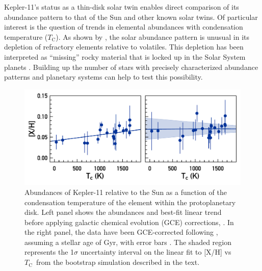 \documentclass[twocolumn,trackchanges]{aastex61}
\newcommand{\tc}{$T_\mathrm{C}$}
\begin{document}
Kepler-11's status as a thin-disk solar twin enables direct comparison of its abundance pattern to that of the Sun and other known solar twins. Of particular interest is the question of trends in elemental abundances with condensation temperature (\tc). As shown by \citet{Melendez2009}, the solar abundance pattern is unusual in its depletion of refractory elements relative to volatiles. This depletion has been interpreted as ``missing'' rocky material that is locked up in the Solar System planets \citep{Chambers2010}. Building up the number of stars with precisely characterized abundance patterns and planetary systems can help to test this possibility.


\begin{figure}
\centering
\includegraphics[scale=0.6]{K11_Tc_linear}
\caption{Abundances of Kepler-11 relative to the Sun as a function of the condensation temperature of the element within the protoplanetary disk.  Left panel shows the abundances and best-fit linear trend before applying galactic chemical evolution (GCE) corrections, . In the right panel, the data have been GCE-corrected following \citet{Spina2016b}, assuming a stellar age of  Gyr, with error bars . The shaded region represents the 1$\sigma$ uncertainty interval on the linear fit to [X/H] vs \tc\ from the bootstrap simulation described in the text.}
\label{fig:tc}
\end{figure}
\end{document}
